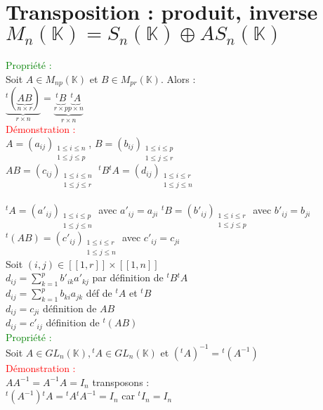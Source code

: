 \documentclass{article}
\begin{document}
	\section{Transposition : produit, inverse $M_n(\mathbb K)= S_n(\mathbb K) \oplus AS_n(\mathbb K)$}
	\textcolor{green}{Propriété :} \\
	Soit $A \in M_{np}( \mathbb K)$ et $B \in  M_{pr}(\mathbb K)$. Alors : \\
	 \indent $ \underbrace{{}^t(\underbrace{AB}_{n \times r})}_{r \times n}=\underbrace{\underbrace{{}^t B}_{r \times p}  \underbrace{{}^tA}_{p \times n}}_{r \times n}$ \\
	 \textcolor{red}{Démonstration :} \\
	 $A=(a_{ij}){}_{\substack{1\leq i\leq n \\ 1\leq j\leq p}}$,
	 $B=(b_{ij}){}_{\substack{1\leq i\leq p \\ 1\leq j\leq r}}$ \\
	 $AB=(c_{ij}){}_{\substack{1\leq i\leq n \\ 1\leq j\leq r}}$
	 ${}^tB{}^tA=(d_{ij}){}_{\substack{1\leq i\leq r \\ 1\leq j\leq n}}$ \\ \\
	 ${}^tA=(a'_{ij}){}_{\substack{1\leq i\leq p \\ 1\leq j\leq n}}$ avec $a'_{ij}=a_{ji}$
	 ${}^t B=(b'_{ij}){}_{\substack{1\leq i\leq r \\ 1\leq j\leq p}}$ avec $b'_{ij}=b_{ji}$
	 ${}^t(AB)=(c'_{ij}){}_{\substack{1\leq i\leq r \\ 1\leq j \leq n}}$ avec  $c'_{ij}=c_{ji}$ \\
	 Soit $(i,j) \in [[1,r]] \times [[1,n]]$ \\
	 $d_{ij} = \sum_{k=1}^p b'_{ik}a'_{kj}$ par définition de ${}^t B {}^t A$ \\
	 $d_{ij} =\sum_{k=1}^p b_{ki}a_{jk}$ déf de ${}^t A$ et ${}^tB$ \\
	 $d_{ij}=c_{ji}$ définition de $AB$ \\
	 $d_{ij}=c'_{ij}$ définition de ${}^t (AB)$ \\
\textcolor{green}{Propriété :} \\
Soit $A \in GL_n ( \mathbb K), {}^tA \in GL_n(\mathbb K)$ et $({}^tA)^{-1}={}^t(A^{-1})$ \\
\textcolor{red}{Démonstration :} \\
$AA^{-1}=A^{-1}A=I_n$ transposons : \\
${}^t (A^{-1}){}^tA= {}^t A {}^t A^{-1}=I_n$ car ${}^t I_n=I_n$ \\
\end{document}
